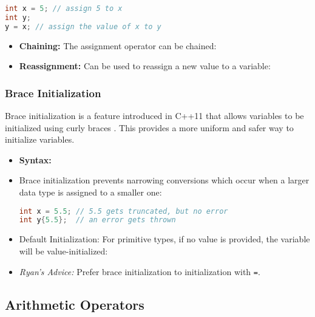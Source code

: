 \documentclass{article}
\begin{document}
\begin{lstlisting}[language=C++]
int x = 5; // assign 5 to x
int y;
y = x; // assign the value of x to y
\end{lstlisting}

\begin{itemize}
	\item \textbf{Chaining:} The assignment operator can be chained:
	\item \textbf{Reassignment:} Can be used to reassign a new value to a variable:
\end{itemize}

\subsubsection{Brace Initialization \inlinecpp{\{\}}}

\noindent
Brace initialization is a feature introduced in C++11 that allows variables to be initialized using curly braces \inlinecpp{\{\}}. This provides a more uniform and safer way to initialize variables.

\begin{itemize}
	\item \textbf{Syntax:} 
	\item Brace initialization prevents narrowing conversions which occur when a larger data type is assigned to a smaller one:
\begin{lstlisting}[language=C++]
int x = 5.5; // 5.5 gets truncated, but no error
int y{5.5};  // an error gets thrown
\end{lstlisting}
	\item Default Initialization: For primitive types, if no value is provided, the variable will be value-initialized:
	\item \textsl{Ryan's Advice:} Prefer brace initialization to initialization with \texttt{=}.
\end{itemize}

\subsection{Arithmetic Operators}
\end{document}
